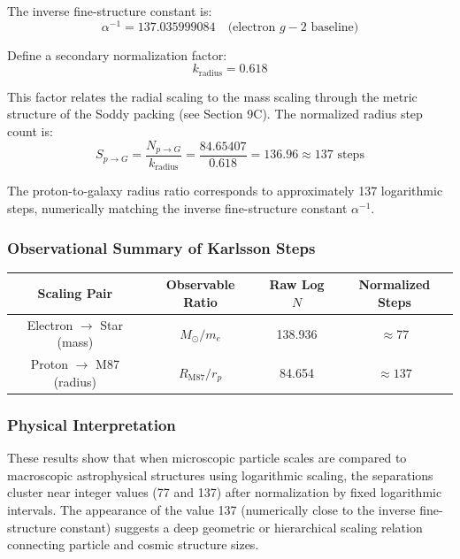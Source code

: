 \documentclass[11pt,a4paper]{article}
\begin{document}
        The inverse fine-structure constant is:
        \[
        \alpha^{-1} = 137.035999084 \quad \text{(electron $g-2$ baseline)}
        \]

        Define a secondary normalization factor:
        \[
        k_{\text{radius}} = 0.618
        \]

        This factor relates the radial scaling to the mass scaling through the metric structure of the Soddy packing (see Section 9C). The normalized radius step count is:
        \[
        S_{p \to G} = \frac{N_{p \to G}}{k_{\text{radius}}} = \frac{84.65407}{0.618} = 136.96 \approx \boxed{137 \text{ steps}}
        \]

      The proton-to-galaxy radius ratio corresponds to approximately 137 logarithmic steps, numerically matching the inverse fine-structure constant $\alpha^{-1}$.

    \subsubsection{Observational Summary of Karlsson Steps}

      \begin{table}[h]
      \centering
      \begin{tabular}{|c|c|c|c|}
      \hline
      \textbf{Scaling Pair} & \textbf{Observable Ratio} & \textbf{Raw Log $N$} & \textbf{Normalized Steps} \\
      \hline
      Electron $\to$ Star (mass) & $M_\odot/m_e$ & 138.936 & $\approx 77$ \\
      Proton $\to$ M87 (radius) & $R_{\text{M87}}/r_p$ & 84.654 & $\approx 137$ \\
      \hline
      \end{tabular}
      \end{table}

    \subsubsection{Physical Interpretation}

      These results show that when microscopic particle scales are compared to macroscopic astrophysical structures using logarithmic scaling, the separations cluster near integer values (77 and 137) after normalization by fixed logarithmic intervals. The appearance of the value 137 (numerically close to the inverse fine-structure constant) suggests a deep geometric or hierarchical scaling relation connecting particle and cosmic structure sizes.
\end{document}
